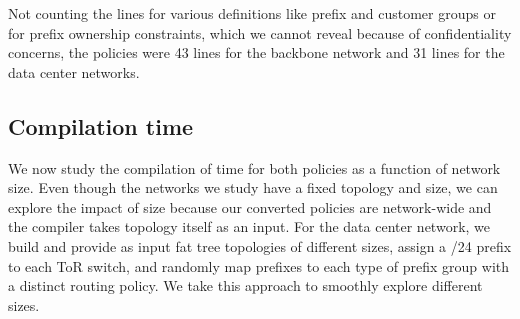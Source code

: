 Not counting the lines for various definitions like prefix and customer groups or for prefix ownership constraints, which we cannot reveal because of confidentiality concerns, the \sysname policies were 43 lines for the backbone network and 31 lines for the data center networks.

\subsection{Compilation time}




We now study the compilation of time for both policies as a function of network size. Even though the networks we study have a fixed topology and size, we can explore the impact of size because our converted policies are network-wide and the compiler takes topology itself as an input. For the data center network, we build and provide as input fat tree topologies of different sizes, assign a /24 prefix to each ToR switch, and randomly map prefixes to each type of prefix group with a distinct routing policy. We take this approach to smoothly explore different sizes. 

